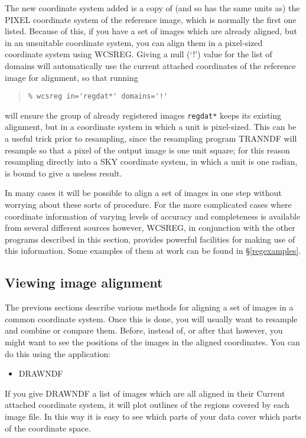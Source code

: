 \documentclass[twoside,11pt]{article}
\newcommand{\hyperref}[4]{#2\ref{#4}#3}
\newcommand{\htmlref}[2]{#1}
\newcommand{\latexhtml}[2]{#1}
\newcommand{\xlabel}[1]{}
\renewcommand{\_}{\texttt{\symbol{95}}}
\newcommand{\ttsize}{\latexhtml{\small}{}}
\newenvironment{myquote}{\begin{quote}\ttsize}{\end{quote}}
\newcommand{\routine}[1]{{\sc #1}}
\newcommand{\xroutine}[1]{\htmlref{{\sc #1}}{#1}}
\begin{document}
The new coordinate system added is a copy of (and so has the same
units as) the PIXEL coordinate system of the reference image,
which is normally the first one listed.
Because of this, if you have
a set of images which are already aligned, but in an 
unsuitable coordinate system, 
you can align them in a pixel-sized coordinate system using
\routine{WCSREG}. 
Giving a null (`!') value for the list of domains will automatically
use the current attached coordinates of the reference image for 
alignment, so that running
\begin{myquote}
\begin{verbatim}
% wcsreg in='regdat*' domains='!'
\end{verbatim}
\end{myquote}
will ensure the group of already registered images {\tt regdat*} 
keeps its existing alignment, but in a coordinate system in 
which a unit is pixel-sized.
This can be a useful trick prior to resampling, 
since the resampling program \xroutine{TRANNDF} will
resample so that a pixel of the output image is one unit square;
for this reason resampling directly into a SKY coordinate system,
in which a unit is one radian, is bound to give a useless result.

In many cases it will be possible to align a set of images in
one step without worrying about these sorts of procedure.
For the more complicated cases where 
coordinate information of varying levels of 
accuracy and completeness is available from several
different sources however,
\routine{WCSREG}, in conjunction with the other programs described
in this section, provides powerful facilities for making use of
this information.  Some examples of them at work can be found
in \hyperref{the examples section}{\S }{}{regexamples}.


\subsection{\xlabel{view-align}\label{view-align}Viewing image alignment}

The previous sections describe various methods for aligning 
a set of images in a common coordinate system.  
Once this is done, you will usually want to resample and combine
or compare them.
Before, instead of, or after that however, you might want to see
the positions of the images in the aligned coordinates. 
You can do this using the application:
\begin{itemize}
\item \xroutine{DRAWNDF}
\end{itemize}
If you give \routine{DRAWNDF} 
a list of images which are all aligned in their 
Current attached coordinate system, it will plot
outlines of the regions covered by each image file.  
In this way it is easy to see 
which parts of your data cover which parts of the coordinate space.
\end{document}
